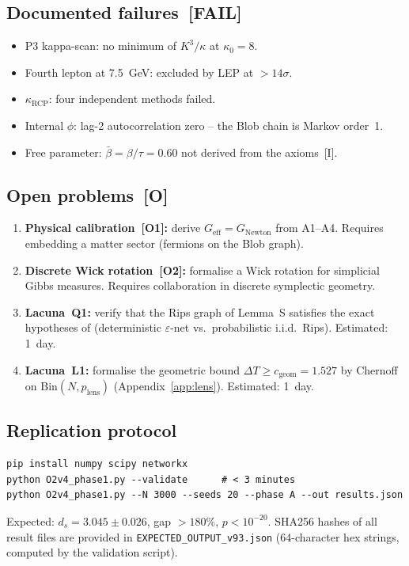 \documentclass[11pt, a4paper]{article}
\begin{document}
\subsection{Documented failures~[FAIL]}
\begin{itemize}
\item P3 kappa-scan: no minimum of $K^3/\kappa$ at $\kappa_0=8$.
\item Fourth lepton at 7.5~GeV: excluded by LEP at $>14\sigma$.
\item $\kappa_{\mathrm{RCP}}$: four independent methods failed.
\item Internal $\phi$: lag-2 autocorrelation zero – the Blob chain
      is Markov order~1.
\item Free parameter: $\bar\beta=\beta/\tau=0.60$ not derived from
      the axioms~[I].
\end{itemize}

\subsection{Open problems~[O]}
\begin{enumerate}[label=O\arabic*:]
\item \textbf{Physical calibration~[O1]:}
      derive $G_{\mathrm{eff}}=G_{\mathrm{Newton}}$ from A1--A4.
      Requires embedding a matter sector (fermions on the Blob graph).
\item \textbf{Discrete Wick rotation~[O2]:}
      formalise a Wick rotation for simplicial Gibbs measures.
      Requires collaboration in discrete symplectic geometry.
\item \textbf{Lacuna~Q1:}
      verify that the Rips graph of Lemma~S satisfies the exact
      hypotheses of \cite{GarciaTrillos2020}
      (deterministic $\varepsilon$-net vs.\ probabilistic i.i.d.\ Rips).
      Estimated: 1~day.
\item \textbf{Lacuna~L1:}
      formalise the geometric bound $\Delta T\ge c_{\mathrm{geom}}=1.527$
      by Chernoff on $\mathrm{Bin}(N,p_{\mathrm{lens}})$
      (Appendix~\ref{app:lens}).
      Estimated: 1~day.
\end{enumerate}

\subsection{Replication protocol}
\begin{verbatim}
pip install numpy scipy networkx
python O2v4_phase1.py --validate      # < 3 minutes
python O2v4_phase1.py --N 3000 --seeds 20 --phase A --out results.json
\end{verbatim}
Expected: $d_s=3.045\pm0.026$, gap $>180\%$, $p<10^{-20}$.
SHA256 hashes of all result files are provided in
\texttt{EXPECTED\_OUTPUT\_v93.json} (64-character hex strings,
computed by the validation script).
\end{document}
